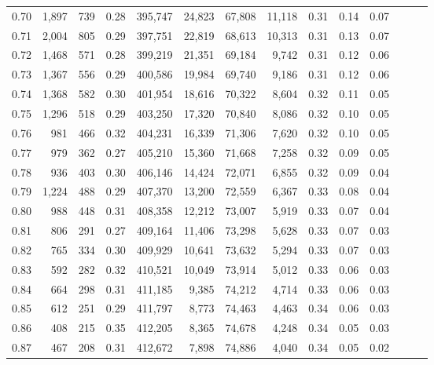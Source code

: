 \begin{tabular}{rrrrrrrrrrrrrr}
0.70 &   1,897 &    739 &  0.28 &  395,747 &   24,823 &  67,808 &  11,118 &  0.31 &  0.14 &      0.07 \\
0.71 &   2,004 &    805 &  0.29 &  397,751 &   22,819 &  68,613 &  10,313 &  0.31 &  0.13 &      0.07 \\
0.72 &   1,468 &    571 &  0.28 &  399,219 &   21,351 &  69,184 &   9,742 &  0.31 &  0.12 &      0.06 \\
0.73 &   1,367 &    556 &  0.29 &  400,586 &   19,984 &  69,740 &   9,186 &  0.31 &  0.12 &      0.06 \\
0.74 &   1,368 &    582 &  0.30 &  401,954 &   18,616 &  70,322 &   8,604 &  0.32 &  0.11 &      0.05 \\
0.75 &   1,296 &    518 &  0.29 &  403,250 &   17,320 &  70,840 &   8,086 &  0.32 &  0.10 &      0.05 \\
0.76 &     981 &    466 &  0.32 &  404,231 &   16,339 &  71,306 &   7,620 &  0.32 &  0.10 &      0.05 \\
0.77 &     979 &    362 &  0.27 &  405,210 &   15,360 &  71,668 &   7,258 &  0.32 &  0.09 &      0.05 \\
0.78 &     936 &    403 &  0.30 &  406,146 &   14,424 &  72,071 &   6,855 &  0.32 &  0.09 &      0.04 \\
0.79 &   1,224 &    488 &  0.29 &  407,370 &   13,200 &  72,559 &   6,367 &  0.33 &  0.08 &      0.04 \\
0.80 &     988 &    448 &  0.31 &  408,358 &   12,212 &  73,007 &   5,919 &  0.33 &  0.07 &      0.04 \\
0.81 &     806 &    291 &  0.27 &  409,164 &   11,406 &  73,298 &   5,628 &  0.33 &  0.07 &      0.03 \\
0.82 &     765 &    334 &  0.30 &  409,929 &   10,641 &  73,632 &   5,294 &  0.33 &  0.07 &      0.03 \\
0.83 &     592 &    282 &  0.32 &  410,521 &   10,049 &  73,914 &   5,012 &  0.33 &  0.06 &      0.03 \\
0.84 &     664 &    298 &  0.31 &  411,185 &    9,385 &  74,212 &   4,714 &  0.33 &  0.06 &      0.03 \\
0.85 &     612 &    251 &  0.29 &  411,797 &    8,773 &  74,463 &   4,463 &  0.34 &  0.06 &      0.03 \\
0.86 &     408 &    215 &  0.35 &  412,205 &    8,365 &  74,678 &   4,248 &  0.34 &  0.05 &      0.03 \\
0.87 &     467 &    208 &  0.31 &  412,672 &    7,898 &  74,886 &   4,040 &  0.34 &  0.05 &      0.02 \\

\end{tabular}
